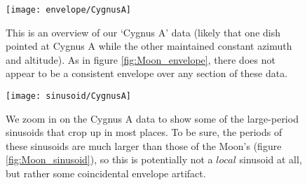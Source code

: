 \documentclass[12pt]{article}
\begin{document}
\begin{figure}
	\centering
	\texttt{[image: envelope/CygnusA]}
	\caption{This is an overview of our `Cygnus A' data (likely that one dish pointed at Cygnus A while the other maintained constant azimuth and altitude). As in figure \ref{fig:Moon_envelope}, there does not appear to be a consistent envelope over any section of these data.}
	\label{fig:Cyg_envelope}
\end{figure}

\begin{figure}
	\centering
	\texttt{[image: sinusoid/CygnusA]}
	\caption{We zoom in on the Cygnus A data to show some of the large-period sinusoids that crop up in most places. To be sure, the periods of these sinusoids are much larger than those of the Moon's (figure \ref{fig:Moon_sinusoid}), so this is potentially not a $local$ sinusoid at all, but rather some coincidental envelope artifact.}
	\label{fig:Cyg_sinusoid}
\end{figure}
\end{document}

